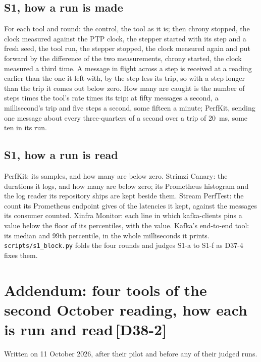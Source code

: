 \documentclass[11pt]{article}
\newcommand{\chgold}[1]{\,{\color{oldcol}\bfseries\footnotesize[#1]}}
\begin{document}
\subsection*{S1, how a run is made}
For each tool and round: the control, the tool as it is; then chrony stopped, the clock measured
against the PTP clock, the stepper started with its step and a fresh seed, the tool run, the
stepper stopped, the clock measured again and put forward by the difference of the two
measurements, chrony started, the clock measured a third time. A message in flight across a step is received at a
reading earlier than the one it left with, by the step less its trip, so with a step longer than
the trip it comes out below zero. How many are caught is the number of steps times the tool's rate
times its trip: at fifty messages a second, a millisecond's trip and five steps a second, some
fifteen a minute; PerfKit, sending one message about every three-quarters of a second over a trip
of 20~ms, some ten in its run.

\subsection*{S1, how a run is read}
PerfKit: its samples, and how many are below zero. Strimzi Canary: the durations it logs, and how
many are below zero; its Prometheus histogram and the log reader its repository ships are kept
beside them. Stream PerfTest: the count its Prometheus endpoint gives of the latencies it kept,
against the messages its consumer counted. Xinfra Monitor: each line in which kafka-clients pins
a value below the floor of its percentiles, with the value. Kafka's end-to-end tool: its median
and 99th percentile, in the whole milliseconds it prints. \texttt{scripts/s1\_block.py} folds the
four rounds and judges S1-a to S1-f as D37-4 fixes them.

\section[Addendum: four tools of the second October reading]{Addendum: four tools of the second October reading, how each is run and read\protect\chgold{D38-2}}\label{sec:addendum-v38}
Written on 11 October 2026, after their pilot and before any of their judged runs.
\end{document}
